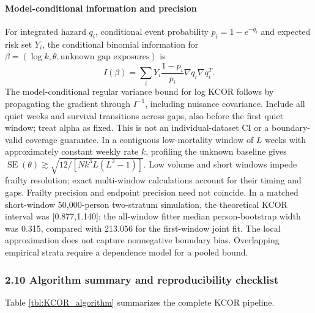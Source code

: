 \documentclass[
]{article}
\begin{document}
\paragraph{Model-conditional information and precision}\label{model-conditional-information-and-precision}

For integrated hazard \(q_i\), conditional event probability \(p_i=1-e^{-q_i}\) and expected risk set \(Y_i\), the conditional binomial information for \(\beta=(\log k,\theta,\text{unknown gap exposures})\) is \[I(\beta)=\sum_i Y_i\frac{1-p_i}{p_i}\nabla q_i\nabla q_i^T.\] The model-conditional regular variance bound for log KCOR follows by propagating the gradient through \(I^{-1}\), including nuisance covariance. Include all quiet weeks and survival transitions across gaps, also before the first quiet window; treat alpha as fixed. This is not an individual-dataset CI or a boundary-valid coverage guarantee. In a contiguous low-mortality window of \(L\) weeks with approximately constant weekly rate \(k\), profiling the unknown baseline gives \(\operatorname{SE}(\theta)\gtrsim\sqrt{12/[Nk^3 L(L^2-1)]}\). Low volume and short windows impede frailty resolution; exact multi-window calculations account for their timing and gaps. Frailty precision and endpoint precision need not coincide. In a matched short-window 50,000-person two-stratum simulation, the theoretical KCOR interval was {[}0.877,1.140{]}; the all-window fitter median person-bootstrap width was 0.315, compared with 213.056 for the first-window joint fit. The local approximation does not capture nonnegative boundary bias. Overlapping empirical strata require a dependence model for a pooled bound.

\subsubsection{2.10 Algorithm summary and reproducibility checklist}\label{algorithm-summary-and-reproducibility-checklist}

Table \ref{tbl:KCOR_algorithm} summarizes the complete KCOR pipeline.
\end{document}
